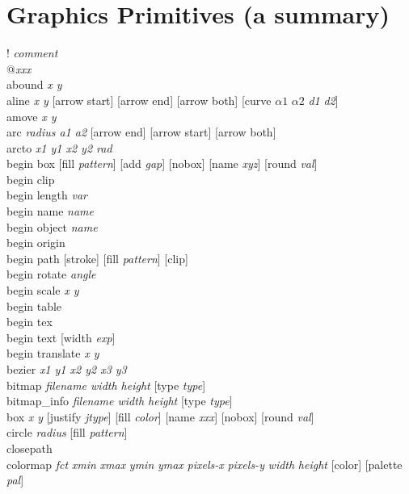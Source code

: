 \section{Graphics Primitives (a summary)}
{\sf ! {\it comment}} \\
{\sf @{\it xxx}} \\
{\sf abound {\it x y}} \\
{\sf aline {\it x y} [arrow start] [arrow end] [arrow both] [curve {\it $\alpha1$} {\it $\alpha2$} {\it d1} {\it d2}]} \\
{\sf amove {\it x y}}  \\
{\sf arc {\it radius a1 a2} [arrow end] [arrow start] [arrow both]} \\
{\sf arcto {\it x1 y1 x2 y2 rad}}  \\
{\sf begin box [fill {\it pattern}] [add {\it gap}] [nobox] [name {\it xyz}] [round {\it val}]}  \\
{\sf begin clip }  \\
{\sf begin length {\it var}} \\
{\sf begin name {\it name}}  \\
{\sf begin object {\it name}}  \\
{\sf begin origin}  \\
{\sf begin path [stroke] [fill {\it pattern}] [clip]}  \\
{\sf begin rotate {\it angle}}  \\
{\sf begin scale {\it x y}}  \\
{\sf begin table }  \\
{\sf begin tex } \\
{\sf begin text [width {\it exp}] }    \\
{\sf begin translate {\it x y}}  \\
{\sf bezier {\it x1 y1 x2 y2 x3 y3}}  \\
{\sf bitmap {\it filename width height} [type {\it type}]} \\
{\sf bitmap\_info {\it filename width height} [type {\it type}]} \\
{\sf box {\it x y} [justify {\it jtype}] [fill {\it color}] [name {\it xxx}] [nobox] [round {\it val}]} \\
{\sf circle {\it radius} [fill {\it pattern}]}  \\
{\sf closepath }  \\
{\sf colormap {\it fct} {\it xmin} {\it xmax} {\it ymin} {\it ymax} {\it pixels-x} {\it pixels-y} {\it width} {\it height} [color] [palette {\it pal}]} \\
